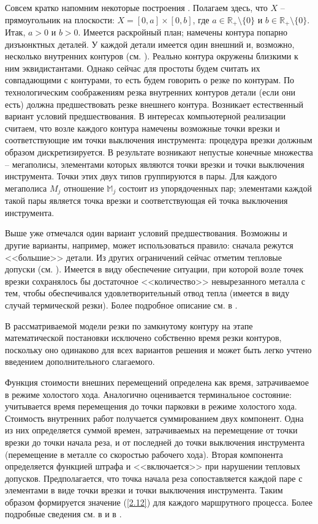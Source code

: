 \documentclass[10pt]{SPIIRAS_Proceedings}
\begin{document}
Совсем кратко напомним некоторые построения \cite[$\S$ 3.3]{4}.
Полагаем здесь, что $X$ -- прямоугольник на плоскости:
$X = [0,a] \times [0,b]$,
где $a \in \mathbb{R}_+ \setminus \{0\}$ и $b \in \mathbb{R}_+ \setminus \{0\}.$
Итак, $a > 0$ и $b > 0.$
Имеется раскройный план;
намечены контура попарно дизъюнктных деталей.
У каждой детали имеется один внешний и,
возможно,
несколько внутренних контуров
(см. \cite[\S~3.2]{4}).
Реально контура окружены близкими к ним эквидистантами.
Однако сейчас для простоты
будем считать их совпадающими с контурами,
то есть будем говорить о резке по контурам.
По технологическим соображениям
резка внутренних контуров детали
(если они есть)
должна предшествовать резке внешнего контура.
Возникает естественный вариант условий предшествования.
В интересах компьютерной реализации считаем,
что возле каждого контура намечены возможные
точки врезки и соответствующие им точки выключения инструмента:
процедура врезки должным образом дискретизируется.
В результате возникают непустые конечные множества --
мегаполисы,
элементами которых являются точки врезки
и точки выключения инструмента.
Точки этих двух типов группируются в пары.
Для каждого мегаполиса
$M_j$
отношение
$\mathbb{M}_j$
состоит из упорядоченных пар;
элементами каждой такой пары является
точка врезки
и соответствующая ей точка выключения инструмента.

Выше уже отмечался один вариант
условий предшествования.
Возможны и другие варианты,
например,
может использоваться правило:
сначала режутся <<большие>> детали.
Из других ограничений сейчас отметим
тепловые допуски
(см. \cite{18}).
Имеется в виду обеспечение ситуации,
при которой возле точек врезки сохранялось бы
достаточное <<количество>>
невырезанного металла с тем,
чтобы обеспечивался удовлетворительный отвод тепла
(имеется в виду случай термической резки).
Более подробное описание см. в \cite{18}.

В рассматриваемой модели резки
по замкнутому контуру
на этапе математической постановки исключено
собственно время резки контуров,
поскольку оно одинаково для всех вариантов решения
и может быть легко учтено введением
дополнительного слагаемого.

Функция стоимости внешних перемещений
определена как время,
затрачиваемое в режиме холостого хода.
Аналогично оценивается терминальное состояние:
учитывается время перемещения до точки парковки
в режиме холостого хода.
Стоимость внутренних работ
получается суммированием двух компонент.
Одна из них определяется суммой времен,
затрачиваемых на перемещение
от точки врезки до точки начала реза,
и от последней до точки выключения инструмента
(перемещение в металле со скоростью рабочего хода).
Вторая компонента определяется функцией штрафа и
<<включается>> при нарушении тепловых допусков.
Предполагается, что точка начала реза
сопоставляется каждой паре с элементами в виде
точки врезки и точки выключения инструмента.
Таким образом
формируется значение (\ref{2.12})
для каждого маршрутного процесса.
Более подробные сведения см. в
\cite[часть 1, глава 3]{4}
и в
\cite{18}.
\end{document}
